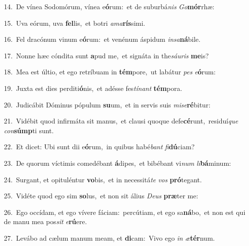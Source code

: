 {\numbfont\textcolor{\numbcolor}{14.}}~De vínea Sodomórum, vínea e\-\textbf{ó}\-rum:~\star et de suburbá\textit{nis} \textit{Go}\-\textbf{mór}rhæ:\par
{\numbfont\textcolor{\numbcolor}{15.}}~Uva eórum, uva \textbf{fel}\-lis,~\star et botri \textit{a}\-\textit{ma}\textbf{rís}simi.\par
{\numbfont\textcolor{\numbcolor}{16.}}~Fel dracónum vinum e\-\textbf{ó}\-rum:~\star et venénum áspidum \textit{in}\-\textit{sa}\textbf{ná}bile.\par
{\numbfont\textcolor{\numbcolor}{17.}}~Nonne hæc cóndita sunt \textbf{a}\-pud me,~\star et signáta in the\-\textit{sáu}\-\textit{ris} \textbf{me}\-is?\par
{\numbfont\textcolor{\numbcolor}{18.}}~Mea est últio, et ego retríbuam in \textbf{tém}\-pore,~\star ut labátur \textit{pes} \textit{e}\-\textbf{ó}rum:\par
{\numbfont\textcolor{\numbcolor}{19.}}~Juxta est dies perditi\-\textbf{ó}\-nis,~\star et adésse fes\-\textit{tí}\-\textit{nant} \textbf{tém}\-pora.\par
{\numbfont\textcolor{\numbcolor}{20.}}~Judicábit Dóminus pópulum \textbf{su}\-um,~\star et in servis suis \textit{mi}\-\textit{se}\textbf{ré}bitur:\par
{\numbfont\textcolor{\numbcolor}{21.}}~Vidébit quod infirmáta sit manus,~\dagger et clausi quoque defe\-\textbf{cé}\-runt,~\star residuí\textit{que} \textit{con}\-\textbf{súmp}ti sunt.\par
{\numbfont\textcolor{\numbcolor}{22.}}~Et dicet: Ubi sunt dii e\-\textbf{ó}\-rum,~\star in quibus habé\textit{bant} \textit{fi}\-\textbf{dú}ciam?\par
{\numbfont\textcolor{\numbcolor}{23.}}~De quorum víctimis comedébant \textbf{á}\-dipes,~\star et bibébant vi\textit{num} \textit{li}\-\textbf{bá}minum:\par
{\numbfont\textcolor{\numbcolor}{24.}}~Surgant, et opituléntur \textbf{vo}\-bis,~\star et in necessitá\textit{te} \textit{vos} \textbf{pró}\-tegant.\par
{\numbfont\textcolor{\numbcolor}{25.}}~Vidéte quod ego sim \textbf{so}\-lus,~\star et non sit álius \textit{De}\-\textit{us} \textbf{præ}\-ter me:\par
{\numbfont\textcolor{\numbcolor}{26.}}~Ego occídam, et ego vívere fáciam:~\dagger percútiam, et ego sa\-\textbf{ná}\-bo,~\star et non est qui de manu mea pos\textit{sit} \textit{e}\-\textbf{rú}ere.\par
{\numbfont\textcolor{\numbcolor}{27.}}~Levábo ad cælum manum meam, et \textbf{di}\-cam:~\star Vivo ego \textit{in} \textit{æ}\-\textbf{tér}num.\par
